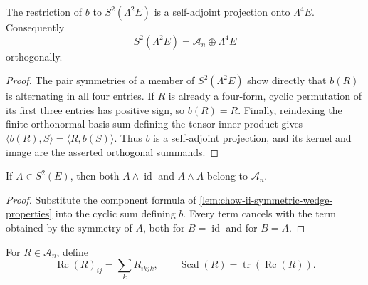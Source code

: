 \begin{lemma}
  \label{lem:chow-ii-bianchi-orthogonal-decomposition}
  The restriction of \(b\) to \(S^2(\Lambda^2E)\) is a self-adjoint
  projection onto \(\Lambda^4E\).  Consequently
  \[
    S^2(\Lambda^2E)=\mathcal A_n\oplus\Lambda^4E
  \]
  orthogonally.
\end{lemma}
\begin{proof}
  The pair symmetries of a member of \(S^2(\Lambda^2E)\) show directly that
  \(b(R)\) is alternating in all four entries.  If \(R\) is already a
  four-form, cyclic permutation of its first three entries has positive sign,
  so \(b(R)=R\).  Finally, reindexing the finite orthonormal-basis sum defining
  the tensor inner product gives \(\langle b(R),S\rangle=\langle R,b(S)\rangle\).
  Thus \(b\) is a self-adjoint projection, and its kernel and image are the
  asserted orthogonal summands.
\end{proof}

\begin{lemma}
  \label{lem:chow-ii-wedge-satisfies-bianchi}
  If \(A\in S^2(E)\), then both
  \(A\wedge\operatorname{id}\) and \(A\wedge A\) belong to \(\mathcal A_n\).
\end{lemma}
\begin{proof}
  Substitute the component formula of
  \ref{lem:chow-ii-symmetric-wedge-properties} into the cyclic sum defining
  \(b\).  Every term cancels with the term obtained by the symmetry of \(A\),
  both for \(B=\operatorname{id}\) and for \(B=A\).
\end{proof}

\begin{definition}
  \label{def:chow-ii-algebraic-ricci-contraction}
  For \(R\in\mathcal A_n\), define
  \[
    \operatorname{Rc}(R)_{ij}=\sum_kR_{ikjk},
    \qquad \operatorname{Scal}(R)=\operatorname{tr}(\operatorname{Rc}(R)).
  \]
\end{definition}

